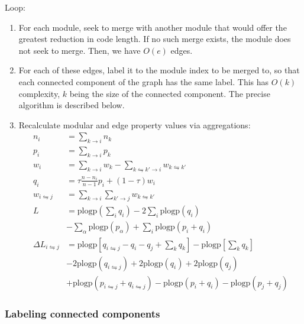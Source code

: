 \documentclass[12pt,a4paper]{article}
\begin{document}
Loop:
\begin{enumerate}
    \item For each module, seek to merge with another module that would offer the greatest reduction in code length. If no such merge exists, the module does not seek to merge. Then, we have \(O(e)\) edges.
    \item For each of these edges, label it to the module index to be merged to, so that each connected component of the graph has the same label. This has \(O(k)\) complexity, \(k\) being the size of the connected component. The precise algorithm is described below.
    \item Recalculate modular and edge property values via aggregations:
        \begin{align*}
            n_i &= \sum_{k\rightarrow i} n_k\\
            p_i &= \sum_{k\rightarrow i} p_k\\
            w_i &= \sum_{k\rightarrow i} w_k -\sum_{k\leftrightharpoons k'\rightarrow i} w_{k\leftrightharpoons k'}\\
            q_i &= \tau\frac{n-n_i}{n-1}p_i +(1-\tau)w_i \\
            w_{i\leftrightharpoons j} &=
                \sum_{k\rightarrow i} \sum_{k'\rightarrow j} w_{k\leftrightharpoons k'} \\
            L &=
                \mathrm{plogp}\left( \sum_iq_i \right)
                -2\sum_i\mathrm{plogp}\left(q_i\right) \\
                & -\sum_\alpha \mathrm{plogp}(p_\alpha)
                +\sum_i\mathrm{plogp}\left( p_i+q_i \right) \\
            \Delta L_{i\leftrightharpoons j} &= \mathrm{plogp}\left[ q_{i\leftrightharpoons j}-q_i-q_j+\sum_k q_k \right] -\mathrm{plogp} \left[ \sum_k q_k \right] \\
    &-2 \mathrm{plogp}(q_{i\leftrightharpoons j}) +2\mathrm{plogp}(q_i) +2\mathrm{plogp}(q_j) \\
    &+\mathrm{plogp}(p_{i\leftrightharpoons j}+q_{i\leftrightharpoons j}) -\mathrm{plogp}(p_i+q_i) -\mathrm{plogp}(p_j+q_j)
    \end{align*}
\end{enumerate}

\subsubsection*{Labeling connected components}
\end{document}

